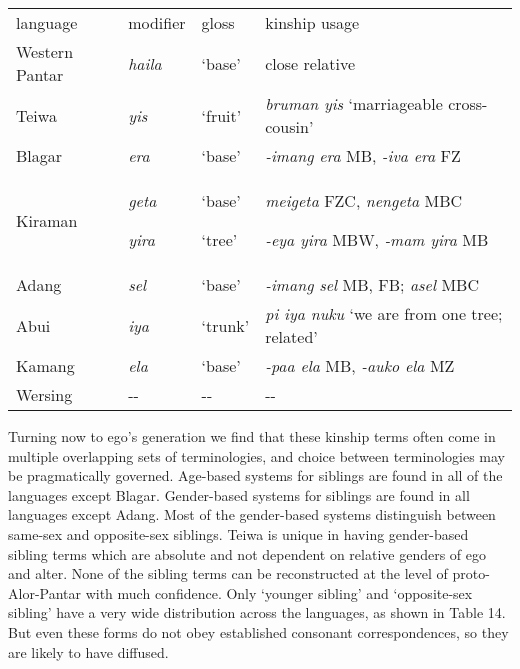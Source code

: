 \begin{center}
\tablehead{}
\begin{supertabular}{m{1.0080599in}m{0.5969598in}m{0.49555984in}m{2.6511598in}}
language  &
modifier &
gloss &
kinship usage\\
Western Pantar &
\textit{haila}  &
{\textquoteleft}base{\textquoteright} &
close relative\\
Teiwa &
\textit{yis}  &
{\textquoteleft}fruit{\textquoteright} &
\textit{bruman yis }{\textquoteleft}marriageable cross-cousin{\textquoteright}\\
Blagar &
\textit{era}  &
{\textquoteleft}base{\textquoteright} &
\textit{{}-imang era} MB, \textit{{}-iva era} FZ\\
Kiraman &
\textit{geta} 

\textit{yira}  &
{\textquoteleft}base{\textquoteright}

{\textquoteleft}tree{\textquoteright} &
\textit{meigeta} FZC, \textit{nengeta} MBC

\textit{{}-eya yira} MBW, \textit{{}-mam yira} MB\\
Adang &
\textit{sel} &
{\textquoteleft}base{\textquoteright} &
\textit{{}-imang sel }MB, FB; \textit{asel }MBC\\
Abui &
\textit{iya } &
{\textquoteleft}trunk{\textquoteright} &
\textit{pi iya nuku }{\textquoteleft}we are from one tree; related{\textquoteright}\\
Kamang &
\textit{ela}  &
{\textquoteleft}base{\textquoteright} &
\textit{{}-paa ela }MB, \textit{{}-auko ela} MZ\\
Wersing &
{}-{}- &
{}-{}- &
{}-{}-\\
\end{supertabular}
\end{center}
Turning now to ego{\textquoteright}s generation we find that these kinship terms often come in multiple overlapping sets of terminologies, and choice between terminologies may be pragmatically governed. Age-based systems for siblings are found in all of the languages except Blagar. Gender-based systems for siblings are found in all languages except Adang. Most of the gender-based systems distinguish between same-sex and opposite-sex siblings. Teiwa is unique in having gender-based sibling terms which are absolute and not dependent on relative genders of ego and alter. None of the sibling terms can be reconstructed at the level of proto-Alor-Pantar with much confidence. Only {\textquoteleft}younger sibling{\textquoteright} and {\textquoteleft}opposite-sex sibling{\textquoteright} have a very wide distribution across the languages, as shown in Table 14. But even these forms do not obey established consonant correspondences, so they are likely to have diffused.


